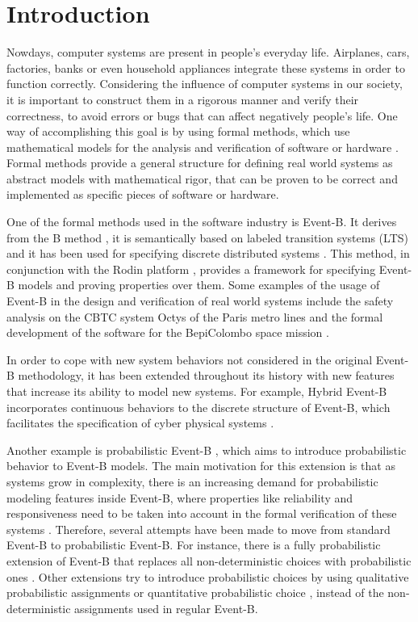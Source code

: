 \chapter{Introduction}
Nowdays, computer systems are present in people's everyday life. Airplanes, cars, factories, banks or even household appliances integrate these systems in order to function correctly. Considering the influence of computer systems in our society, it is important to construct them in a rigorous manner and verify their correctness, to avoid errors or bugs that can affect negatively people's life. One way of accomplishing this goal is by using formal methods, which use mathematical models for the analysis and verification of software or hardware \cite{Woodcock2009}. Formal methods provide a general structure for defining real world systems as abstract models with mathematical rigor, that can be proven to be correct and implemented as specific pieces of software or hardware.   

One of the formal methods used in the software industry is Event-B. It derives from the B method \cite{Abrial1996}, it is semantically based on labeled transition systems (LTS) \cite{LTS} and it has been used for specifying discrete distributed systems \cite{Abrial2011}. This method, in conjunction with the Rodin platform \cite{Rodin}, provides a framework for specifying Event-B models and proving properties over them. Some examples of the usage of Event-B in the design and verification of real world systems include the safety analysis on the CBTC system Octys of the Paris metro lines \cite{Comptier2017} and the formal development of the software for the BepiColombo space mission \cite{Iliasov2010}. 

In order to cope with new system behaviors not considered in the original Event-B methodology, it has been extended throughout its history with new features that increase its ability to model new systems. For example, Hybrid Event-B incorporates continuous behaviors to the discrete structure of Event-B, which facilitates the specification of cyber physical systems \cite{Banach2015}.

Another example is probabilistic Event-B \cite{Morgan2005}, which aims to introduce probabilistic behavior to Event-B models. The main motivation for this extension is that as systems grow in complexity, there is an increasing demand for probabilistic modeling features inside Event-B, where properties like reliability and responsiveness need to be taken into account in the formal verification of these systems \cite{Aouadhi2017}. Therefore, several attempts have been made to move from standard Event-B to probabilistic Event-B. For instance, there is a fully probabilistic extension of Event-B that replaces all non-deterministic choices with probabilistic ones \cite{Aouadhi2017}. Other extensions try to introduce probabilistic choices by using qualitative probabilistic assignments \cite{Hallerstede2007} or quantitative probabilistic choice \cite{Tarasyuk2010}, instead of the non-deterministic assignments used in regular Event-B.

